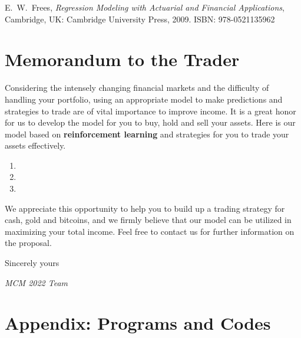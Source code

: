 \documentclass[12pt,a4paper]{article}
\newcommand{\DecisionAlgorithm}{reinforcement learning}
\begin{document}
\begin{spacing}{1.2}
\begin{thebibliography}{00}
E.~W.~Frees, \textit{Regression Modeling with Actuarial and Financial Applications}, Cambridge, UK: Cambridge University Press, 2009. ISBN: 978-0521135962

\end{thebibliography}


\addtocounter{page}{-1}
\thispagestyle{empty}

\newpage
\addtocounter{page}{-1}
\thispagestyle{empty}

{\centering\section*{Memorandum to the Trader}}

Considering the intensely changing financial markets and the difficulty of handling your portfolio, using an appropriate model to make predictions and strategies to trade are of vital importance to improve income. It is a great honor for us to develop the model for you to buy, hold and sell your assets. Here is our model based on \textbf{\DecisionAlgorithm} and strategies for you to trade your assets effectively.  

\begin{enumerate}
	\item 
	
	\item
	
	\item
\end{enumerate}

We appreciate this opportunity to help you to build up a trading strategy for cash, gold and bitcoins, and we firmly believe that our model can be utilized in maximizing your total income. Feel free to contact us for further information on the proposal.

Sincerely yours

\textit{MCM 2022 Team}



\end{spacing}


\newpage
\appendix
\addtocounter{page}{-1}
\thispagestyle{empty}



\section*{Appendix: Programs and Codes}
\end{document}
